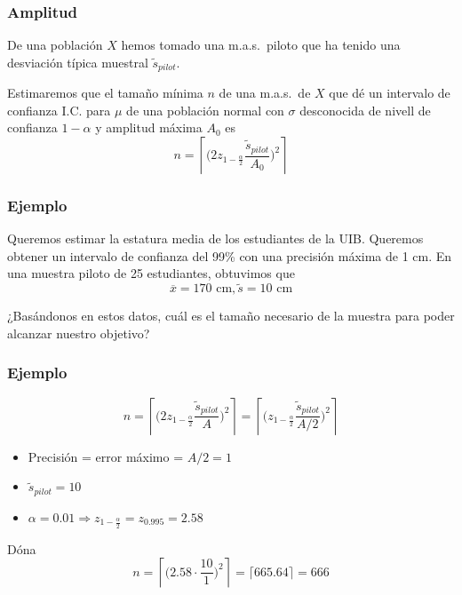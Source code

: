 \documentclass[12pt,t]{beamer}\usepackage[]{graphicx}\usepackage[]{color}
\renewcommand{\emph}[1]{{\color{red}#1}}
\theoremstyle{plain}
\theoremstyle{definition}
\begin{document}
\begin{frame}
\frametitle{Amplitud}

\begin{block}{}
De una población $X$ hemos tomado una  \emph{m.a.s.\ piloto} que ha tenido una  desviación típica muestral $\widetilde{s}_{pilot}$.
\medskip

Estimaremos que el tamaño  mínima $n$ de una m.a.s.\ de $X$ que dé un intervalo de confianza  I.C. para $\mu$ de una población normal
con $\sigma$ desconocida de nivell de confianza  $1-\alpha$ y amplitud máxima $A_0$ es 
$$
n=\left\lceil \Big(2z_{1-\frac{\alpha}{2}}\frac{\widetilde{s}_{pilot}}{A_0}\Big)^2\right\rceil
$$
\end{block}



\end{frame}





\begin{frame}
\frametitle{Ejemplo}

Queremos  estimar la estatura media de los  estudiantes de la UIB. Queremos obtener un intervalo de confianza  del 99\% con 
una precisión máxima de 1 cm. En una muestra piloto de 25 estudiantes,  obtuvimos que  
$$
\overline{x} = 170\mbox{ cm}, \widetilde{s}=10\mbox{ cm}
$$

¿Basándonos en estos  datos, cuál es el tamaño necesario  de la muestra para poder alcanzar nuestro objetivo?

\end{frame}


\begin{frame}
\frametitle{Ejemplo}

$$
n=
\left\lceil \Big(2z_{1-\frac{\alpha}{2}}\frac{\widetilde{s}_{pilot}}{A}\Big)^2\right\rceil=
\left\lceil \Big(z_{1-\frac{\alpha}{2}}\frac{\widetilde{s}_{pilot}}{A/2}\Big)^2\right\rceil
$$

\begin{itemize}
\item Precisión = error máximo = ${A}/{2}=1$
\medskip

\item $\widetilde{s}_{pilot}=10$
\medskip

\item $\alpha=0.01\Rightarrow z_{1-\frac{\alpha}{2}}=z_{0.995}=2.58$
\end{itemize}
Dóna
$$
n=\left\lceil \Big(2.58\cdot \frac{10}{1}\Big)^2\right\rceil=\lceil 665.64\rceil=666
$$

\end{frame}
\end{document}
